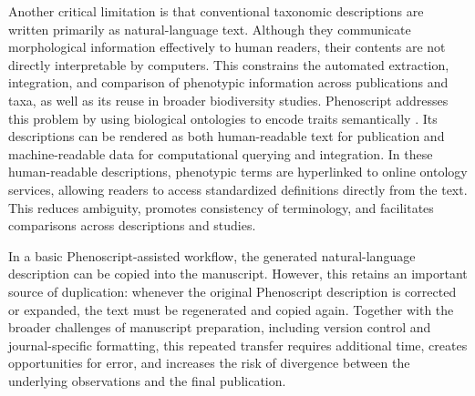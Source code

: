Another critical limitation is that conventional taxonomic descriptions are written primarily as natural-language text. Although they communicate morphological information effectively to human readers, their contents are not directly interpretable by computers. This constrains the automated extraction, integration, and comparison of phenotypic information across publications and taxa, as well as its reuse in broader biodiversity studies. Phenoscript addresses this problem by using biological ontologies to encode traits semantically \citep{ADD_PHENOSCRIPT_REFERENCE}. Its descriptions can be rendered as both human-readable text for publication and machine-readable data for computational querying and integration. In these human-readable descriptions, phenotypic terms are hyperlinked to online ontology services, allowing readers to access standardized definitions directly from the text. This reduces ambiguity, promotes consistency of terminology, and facilitates comparisons across descriptions and studies.

In a basic Phenoscript-assisted workflow, the generated natural-language description can be copied into the manuscript. However, this retains an important source of duplication: whenever the original Phenoscript description is corrected or expanded, the text must be regenerated and copied again. Together with the broader challenges of manuscript preparation, including version control and journal-specific formatting, this repeated transfer requires additional time, creates opportunities for error, and increases the risk of divergence between the underlying observations and the final publication.


